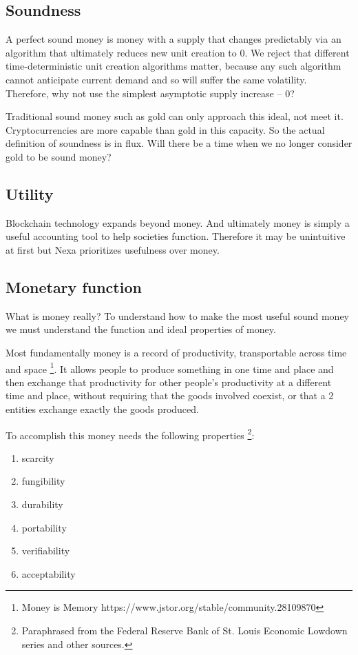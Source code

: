 \documentclass[a4paper, 11pt]{article}
\begin{document}
\subsection{Soundness}
A perfect sound money is money with a supply that changes predictably via an algorithm that ultimately reduces new unit creation to 0.  We reject that different time-deterministic unit creation algorithms matter, because any such algorithm cannot anticipate current demand and so will suffer the same volatility.  Therefore, why not use the simplest asymptotic supply increase – 0? 

Traditional sound money such as gold can only approach this ideal, not meet it.  Cryptocurrencies are more capable than gold in this capacity.  So the actual definition of soundness is in flux.  Will there be a time when we no longer consider gold to be sound money? 


\subsection{Utility}
Blockchain technology expands beyond money.  And ultimately money is simply a useful accounting tool to help societies function.  Therefore it may be unintuitive at first but Nexa prioritizes usefulness over money.


\subsection{Monetary function}
What is money really?  To understand how to make the most useful sound money we must understand the function and ideal properties of money.

Most fundamentally money is a record of productivity, transportable across time and space \footnote{Money is Memory https://www.jstor.org/stable/community.28109870}.  It allows people to produce something in one time and place and then exchange that productivity for other people’s productivity at a different time and place, without requiring that the goods involved coexist, or that a 2 entities exchange exactly the goods produced.

To accomplish this money needs the following properties \footnote{Paraphrased from the Federal Reserve Bank of St. Louis Economic Lowdown series and other sources.}:

\begin{enumerate}
    \item scarcity
    \item fungibility
    \item durability
    \item portability
    \item verifiability
    \item acceptability
\end{enumerate}
\end{document}
